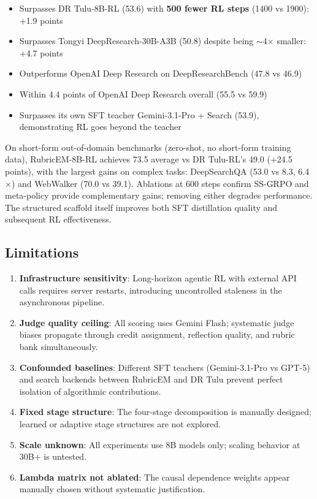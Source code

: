 \documentclass[11pt,a4paper]{article}
\begin{document}
\begin{itemize}[nosep]
\item Surpasses DR Tulu-8B-RL (53.6) with \textbf{500 fewer RL steps} (1400 vs 1900): +1.9 points
\item Surpasses Tongyi DeepResearch-30B-A3B (50.8) despite being ${\sim}$4$\times$ smaller: +4.7 points
\item Outperforms OpenAI Deep Research on DeepResearchBench (47.8 vs 46.9)
\item Within 4.4 points of OpenAI Deep Research overall (55.5 vs 59.9)
\item Surpasses its own SFT teacher Gemini-3.1-Pro + Search (53.9), demonstrating RL goes beyond the teacher
\end{itemize}

On short-form out-of-domain benchmarks (zero-shot, no short-form training data), RubricEM-8B-RL achieves 73.5 average vs DR Tulu-RL's 49.0 (+24.5 points), with the largest gains on complex tasks: DeepSearchQA (53.0 vs 8.3, 6.4$\times$) and WebWalker (70.0 vs 39.1). Ablations at 600 steps confirm SS-GRPO and meta-policy provide complementary gains; removing either degrades performance. The structured scaffold itself improves both SFT distillation quality and subsequent RL effectiveness.

\subsection{Limitations}

\begin{enumerate}[nosep]
\item \textbf{Infrastructure sensitivity}: Long-horizon agentic RL with external API calls requires server restarts, introducing uncontrolled staleness in the asynchronous pipeline.
\item \textbf{Judge quality ceiling}: All scoring uses Gemini Flash; systematic judge biases propagate through credit assignment, reflection quality, and rubric bank simultaneously.
\item \textbf{Confounded baselines}: Different SFT teachers (Gemini-3.1-Pro vs GPT-5) and search backends between RubricEM and DR Tulu prevent perfect isolation of algorithmic contributions.
\item \textbf{Fixed stage structure}: The four-stage decomposition is manually designed; learned or adaptive stage structures are not explored.
\item \textbf{Scale unknown}: All experiments use 8B models only; scaling behavior at 30B+ is untested.
\item \textbf{Lambda matrix not ablated}: The causal dependence weights appear manually chosen without systematic justification.
\end{enumerate}
\end{document}
